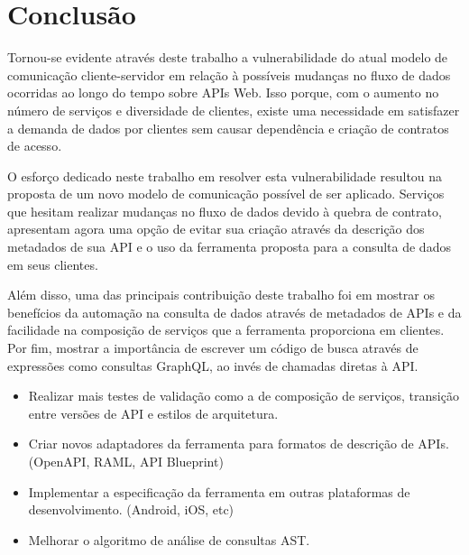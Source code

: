 \chapter{Conclusão}

Tornou-se evidente através deste trabalho a vulnerabilidade do atual modelo de comunicação cliente-servidor em relação à possíveis mudanças no fluxo de dados ocorridas ao longo do tempo sobre APIs Web. Isso porque, com o aumento no número de serviços e diversidade de clientes, existe uma necessidade em satisfazer a demanda de dados por clientes sem causar dependência e criação de contratos de acesso.

O esforço dedicado neste trabalho em resolver esta vulnerabilidade resultou na proposta de um novo modelo de comunicação possível de ser aplicado. Serviços que hesitam realizar mudanças no fluxo de dados devido à quebra de contrato, apresentam agora uma opção de evitar sua criação através da descrição dos metadados de sua API e o uso da ferramenta proposta para a consulta de dados em seus clientes.

Além disso, uma das principais contribuição deste trabalho foi em mostrar os benefícios da automação na consulta de dados através de metadados de APIs e da facilidade na composição de serviços que a ferramenta proporciona em clientes. Por fim, mostrar a importância de escrever um código de busca através de expressões como consultas GraphQL, ao invés de chamadas diretas à API.



\begin{itemize}
\item Realizar mais testes de validação como a de composição de serviços, transição entre versões de API e estilos de arquitetura.
\item Criar novos adaptadores da ferramenta para formatos de descrição de APIs. (OpenAPI, RAML, API Blueprint)
\item Implementar a especificação da ferramenta em outras plataformas de desenvolvimento. (Android, iOS, etc)
\item Melhorar o algoritmo de análise de consultas AST.
\end{itemize}
